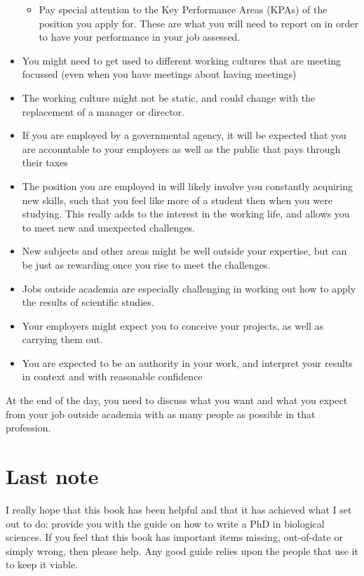 \documentclass[
]{krantz}
\providecommand{\tightlist}{%
  \setlength{\itemsep}{0pt}\setlength{\parskip}{0pt}}
\begin{document}
\begin{itemize}
  \begin{itemize}
  \tightlist
  \item
    Pay special attention to the Key Performance Areas (KPAs) of the position you apply for. These are what you will need to report on in order to have your performance in your job assessed.
  \end{itemize}
\item
  You might need to get used to different working cultures that are meeting focussed (even when you have meetings about having meetings)
\item
  The working culture might not be static, and could change with the replacement of a manager or director.
\item
  If you are employed by a governmental agency, it will be expected that you are accountable to your employers as well as the public that pays through their taxes
\item
  The position you are employed in will likely involve you constantly acquiring new skills, such that you feel like more of a student then when you were studying. This really adds to the interest in the working life, and allows you to meet new and unexpected challenges.
\item
  New subjects and other areas might be well outside your expertise, but can be just as rewarding once you rise to meet the challenges.
\item
  Jobs outside academia are especially challenging in working out how to apply the results of scientific studies.
\item
  Your employers might expect you to conceive your projects, as well as carrying them out.
\item
  You are expected to be an authority in your work, and interpret your results in context and with reasonable confidence
\end{itemize}

At the end of the day, you need to discuss what you want and what you expect from your job outside academia with as many people as possible in that profession.

\hypertarget{lastnote}{%
\chapter*{Last note}\label{lastnote}}


I really hope that this book has been helpful and that it has achieved what I set out to do: provide you with the guide on how to write a PhD in biological sciences. If you feel that this book has important items missing, out-of-date or simply wrong, then please help. Any good guide relies upon the people that use it to keep it viable.
\end{document}
